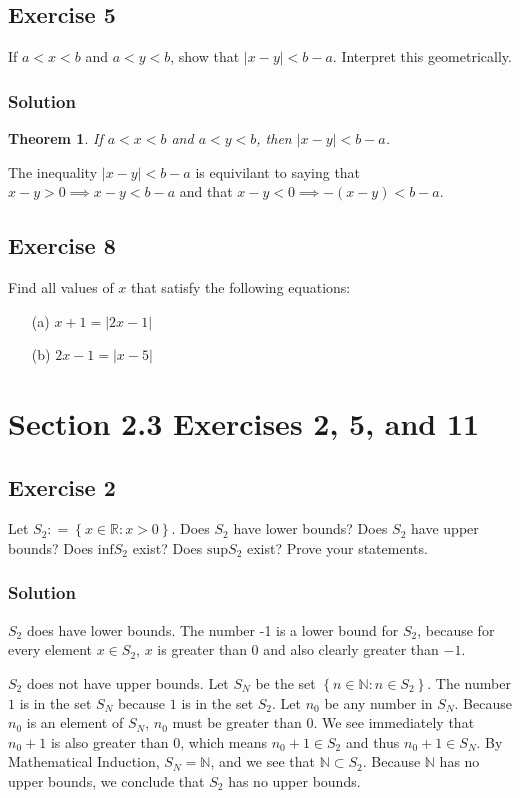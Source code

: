 \documentclass[12pt]{article}
\newtheorem*{thm}{Theorem}
\begin{document}
\subsection*{Exercise 5}
If $a < x < b$ and $a < y < b$, show that $\left|x - y\right| < b - a$. Interpret this geometrically.

\subsubsection*{Solution}
\begin{thm}
If $a < x < b$ and $a < y < b$, then $\left| x - y \right| < b - a$.
\end{thm}

The inequality $\left| x - y \right| < b - a$ is equivilant to saying that $x - y > 0 \implies x - y < b - a$ and that $x - y < 0 \implies -\left(x - y\right) < b - a$.

\subsection*{Exercise 8}
Find all values of $x$ that satisfy the following equations:
\begin{itemize}
\item[(a)] $x + 1 = \left|2x - 1\right|$
\item[(b)] $2x - 1 = \left|x - 5\right|$
\end{itemize}

\section*{Section 2.3 Exercises 2, 5, and 11}

\subsection*{Exercise 2}
Let $S_2 \mathrel{\mathop:}= \left\{x \in \mathbb{R} : x > 0\right\}$. Does $S_2$ have lower bounds? Does $S_2$ have upper bounds? Does $\text{inf}S_2$ exist? Does $\text{sup}S_2$ exist? Prove your statements.

\subsubsection*{Solution}
$S_2$ does have lower bounds. The number -1 is a lower bound for $S_2$, because for every element $x \in S_2$, $x$ is greater than $0$ and also clearly greater than $-1$.

$S_2$ does not have upper bounds. Let $S_N$ be the set $\left\{n \in \mathbb{N} : n \in S_2\right\}$. The number $1$ is in the set $S_N$ because $1$ is in the set $S_2$. Let $n_0$ be any number in $S_N$. Because $n_0$ is an element of $S_N$, $n_0$ must be greater than $0$. We see immediately that $n_0 + 1$ is also greater than $0$, which means $n_0 + 1 \in S_2$ and thus $n_0 + 1 \in S_N$. By Mathematical Induction, $S_N = \mathbb{N}$, and we see that $\mathbb{N} \subset S_2$. Because $\mathbb{N}$ has no upper bounds, we conclude that $S_2$ has no upper bounds.
\end{document}
